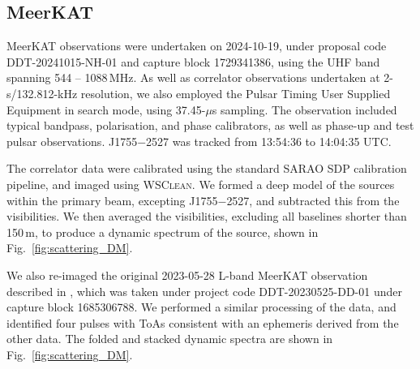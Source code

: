 \documentclass[fleqn,usenatbib]{mnras}
\newcommand{\src}{J1755$-$2527}
\newcommand{\Fig}{Fig.}
\begin{document}
\subsection{MeerKAT} \label{sec:meerkat}

MeerKAT observations were undertaken on 2024-10-19, under proposal code 
DDT-20241015-NH-01 and capture block 1729341386, using the UHF band spanning 544 -- 1088\,MHz. As well as correlator observations undertaken at 2-s/132.812-kHz resolution, we also employed the Pulsar Timing User Supplied Equipment \citep[PTUSE;][]{2020PASA...37...28B} in search mode, using 37.45-$\mu$s sampling. The observation included typical bandpass, polarisation, and phase calibrators, as well as phase-up and test pulsar observations. \src{} was tracked from 13:54:36 to 14:04:35 UTC.

The correlator data were calibrated using the standard SARAO SDP calibration pipeline, and imaged using \textsc{WSClean}. We formed a deep model of the sources within the primary beam, excepting \src{}, and subtracted this from the visibilities. We then averaged the visibilities, excluding all baselines shorter than 150\,m, to produce a dynamic spectrum of the source, shown in \Fig~\ref{fig:scattering_DM}.

We also re-imaged the original 2023-05-28 L-band MeerKAT observation described in , which was taken under project code DDT-20230525-DD-01 under capture block 1685306788. We performed a similar processing of the data, and identified four pulses with ToAs consistent with an ephemeris derived from the other data. The folded and stacked dynamic spectra are shown in \Fig~\ref{fig:scattering_DM}.
\end{document}
